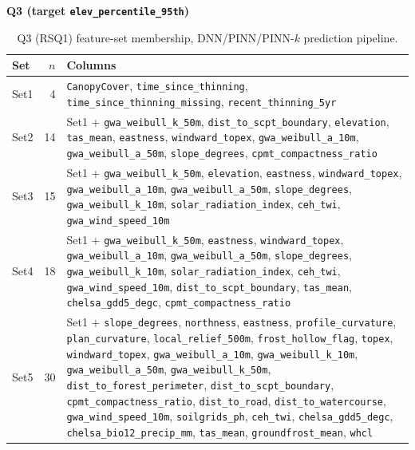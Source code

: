 \begin{table}[H]
\centering
\textbf{Q3 (target \texttt{elev\_percentile\_95th})}\\[4pt]
\scriptsize
\renewcommand{\arraystretch}{1.1}
\begin{tabularx}{\linewidth}{@{} l r >{\raggedright\arraybackslash}X @{}}
\toprule
Set & $n$ & Columns \\
\midrule
Set1 & 4 & \texttt{CanopyCover}, \texttt{time\_since\_thinning}, \texttt{time\_since\_thinning\_missing}, \texttt{recent\_thinning\_5yr} \\
Set2 & 14 & Set1 + \texttt{gwa\_weibull\_k\_50m}, \texttt{dist\_to\_scpt\_boundary}, \texttt{elevation}, \texttt{tas\_mean}, \texttt{eastness}, \texttt{windward\_topex}, \texttt{gwa\_weibull\_a\_10m}, \texttt{gwa\_weibull\_a\_50m}, \texttt{slope\_degrees}, \texttt{cpmt\_compactness\_ratio} \\
Set3 & 15 & Set1 + \texttt{gwa\_weibull\_k\_50m}, \texttt{elevation}, \texttt{eastness}, \texttt{windward\_topex}, \texttt{gwa\_weibull\_a\_10m}, \texttt{gwa\_weibull\_a\_50m}, \texttt{slope\_degrees}, \texttt{gwa\_weibull\_k\_10m}, \texttt{solar\_radiation\_index}, \texttt{ceh\_twi}, \texttt{gwa\_wind\_speed\_10m} \\
Set4 & 18 & Set1 + \texttt{gwa\_weibull\_k\_50m}, \texttt{eastness}, \texttt{windward\_topex}, \texttt{gwa\_weibull\_a\_10m}, \texttt{gwa\_weibull\_a\_50m}, \texttt{slope\_degrees}, \texttt{gwa\_weibull\_k\_10m}, \texttt{solar\_radiation\_index}, \texttt{ceh\_twi}, \texttt{gwa\_wind\_speed\_10m}, \texttt{dist\_to\_scpt\_boundary}, \texttt{tas\_mean}, \texttt{chelsa\_gdd5\_degc}, \texttt{cpmt\_compactness\_ratio} \\
Set5 & 30 & Set1 + \texttt{slope\_degrees}, \texttt{northness}, \texttt{eastness}, \texttt{profile\_curvature}, \texttt{plan\_curvature}, \texttt{local\_relief\_500m}, \texttt{frost\_hollow\_flag}, \texttt{topex}, \texttt{windward\_topex}, \texttt{gwa\_weibull\_a\_10m}, \texttt{gwa\_weibull\_k\_10m}, \texttt{gwa\_weibull\_a\_50m}, \texttt{gwa\_weibull\_k\_50m}, \texttt{dist\_to\_forest\_perimeter}, \texttt{dist\_to\_scpt\_boundary}, \texttt{cpmt\_compactness\_ratio}, \texttt{dist\_to\_road}, \texttt{dist\_to\_watercourse}, \texttt{gwa\_wind\_speed\_10m}, \texttt{soilgrids\_ph}, \texttt{ceh\_twi}, \texttt{chelsa\_gdd5\_degc}, \texttt{chelsa\_bio12\_precip\_mm}, \texttt{tas\_mean}, \texttt{groundfrost\_mean}, \texttt{whcl} \\
\bottomrule
\end{tabularx}
\caption{\small{Q3 (RSQ1) feature-set membership, DNN/PINN/PINN-$k$ prediction pipeline.}}
\label{tab:feature-sets-q3}
\end{table}

